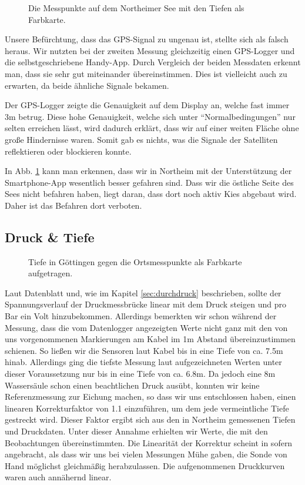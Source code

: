 \documentclass[12pt,a4paper,titlepage,headinclude,bibtotoc]{scrartcl}
\numberwithin{equation}{subsection}
\begin{document}
\begin{figure}[!h]
	\centering
	
	\caption{Die Messpunkte auf dem Northeimer See mit den Tiefen als Farbkarte.}
	\label{fig:GPSNort}
\end{figure}

Unsere Befürchtung, dass das GPS-Signal zu ungenau ist, stellte sich als falsch heraus.
Wir nutzten bei der zweiten Messung gleichzeitig einen GPS-Logger und die selbstgeschriebene Handy-App.
Durch Vergleich der beiden Messdaten erkennt man, dass sie sehr gut miteinander übereinstimmen.
Dies ist vielleicht auch zu erwarten, da beide ähnliche Signale bekamen.

Der GPS-Logger zeigte die Genauigkeit auf dem Display an, welche fast immer 3m betrug.
Diese hohe Genauigkeit, welche sich unter "`Normalbedingungen"' nur selten erreichen lässt, wird dadurch erklärt, dass wir auf einer weiten Fläche ohne große Hindernisse waren.
Somit gab es nichts, was die Signale der Satelliten reflektieren oder blockieren konnte.

In Abb. \ref{fig:GPSNort} kann man erkennen, dass wir in Northeim mit der Unterstützung der Smart\-phone-App wesentlich besser gefahren sind.
Dass wir die östliche Seite des Sees nicht befahren haben, liegt daran, dass dort noch aktiv Kies abgebaut wird.
Daher ist das Befahren dort verboten.


\subsection{Druck \& Tiefe}
\label{sec:ausdruck}
\begin{figure}[!htb]
	\centering
	
	\caption{Tiefe in Göttingen gegen die Ortsmesspunkte als Farbkarte aufgetragen.}
	\label{fig:tiefeGoe}
\end{figure}
Laut Datenblatt und, wie im Kapitel \ref{sec:durchdruck} beschrieben, sollte der Spannungsverlauf der Druckmessbrücke linear mit dem Druck steigen und pro Bar ein Volt hinzubekommen.
Allerdings bemerkten wir schon während der Messung, dass die vom Datenlogger angezeigten Werte nicht ganz mit den von uns vorgenommenen Markierungen am Kabel im 1m Abstand übereinzustimmen schienen.
So ließen wir die Sensoren laut Kabel bis in eine Tiefe von ca. 7.5m hinab.
Allerdings ging die tiefste Messung laut aufgezeichneten Werten unter dieser Voraussetzung nur bis in eine Tiefe von ca. 6.8m.
Da jedoch eine 8m Wassersäule schon einen beachtlichen Druck ausübt, konnten wir keine Referenzmessung zur Eichung machen, so dass wir uns entschlossen haben, einen linearen Korrekturfaktor von 1.1 einzuführen, um dem jede vermeintliche Tiefe gestreckt wird.
Dieser Faktor ergibt sich aus den in Northeim gemessenen Tiefen und Druckdaten.
Unter dieser Annahme erhielten wir Werte, die mit den Beobachtungen übereinstimmten.
Die Linearität der Korrektur scheint in sofern angebracht, als dass wir uns bei vielen Messungen Mühe gaben, die Sonde von Hand möglichst gleichmäßig herabzulassen.
Die aufgenommenen Druckkurven waren auch annähernd linear.
\end{document}
